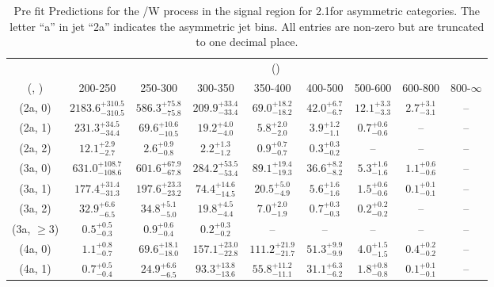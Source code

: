 \begin{table}[h!]
\tiny
\centering
\caption{Pre fit Predictions for the \ttbar/W process in the signal region for 2.1\ifb for asymmetric categories. The letter ``a'' in jet \eg ``2a''  indicates the asymmetric jet bins. All entries are non-zero but are truncated to one decimal place.\label{tab:predsepnaive_sig_ttw_asym}}
\begin{tabular}
{ccccccccc}
	\hline\hline
	& \multicolumn{8}{c}{\scalht (\gev)} \\ 
	 (\njet,  \nb) & 200-250 & 250-300 & 300-350 & 350-400 & 400-500 & 500-600 & 600-800 & 800-$\infty$ \\ [0.8ex] 
\hline
	(2a, 0) & $2183.6^{+ 310.5 }_{- 310.5 }$ & $586.3^{+ 75.8 }_{- 75.8 }$ & $209.9^{+ 33.4 }_{- 33.4 }$ & $69.0^{+ 18.2 }_{- 18.2 }$ & $42.0^{+ 6.7 }_{- 6.7 }$ & $12.1^{+ 3.3 }_{- 3.3 }$ & $2.7^{+ 3.1 }_{- 3.1 }$ & -- \\[0.5ex] 
	(2a, 1) & $231.3^{+ 34.5 }_{- 34.4 }$ & $69.6^{+ 10.6 }_{- 10.5 }$ & $19.2^{+ 4.0 }_{- 4.0 }$ & $5.8^{+ 2.0 }_{- 2.0 }$ & $3.9^{+ 1.2 }_{- 1.1 }$ & $0.7^{+ 0.6 }_{- 0.6 }$ & -- & -- \\[0.5ex] 
	(2a, 2) & $12.1^{+ 2.9 }_{- 2.7 }$ & $2.6^{+ 0.9 }_{- 0.8 }$ & $2.2^{+ 1.3 }_{- 1.2 }$ & $0.9^{+ 0.7 }_{- 0.7 }$ & $0.3^{+ 0.3 }_{- 0.2 }$ & -- & -- & -- \\[0.5ex] 
	(3a, 0) & $631.0^{+ 108.7 }_{- 108.6 }$ & $601.6^{+ 67.9 }_{- 67.8 }$ & $284.2^{+ 53.5 }_{- 53.4 }$ & $89.1^{+ 19.4 }_{- 19.3 }$ & $36.6^{+ 8.2 }_{- 8.2 }$ & $5.3^{+ 1.6 }_{- 1.6 }$ & $1.1^{+ 0.6 }_{- 0.6 }$ & -- \\[0.5ex] 
	(3a, 1) & $177.4^{+ 31.4 }_{- 31.3 }$ & $197.6^{+ 23.3 }_{- 23.2 }$ & $74.4^{+ 14.6 }_{- 14.5 }$ & $20.5^{+ 5.0 }_{- 4.9 }$ & $5.6^{+ 1.6 }_{- 1.6 }$ & $1.5^{+ 0.6 }_{- 0.6 }$ & $0.1^{+ 0.1 }_{- 0.1 }$ & -- \\[0.5ex] 
	(3a, 2) & $32.9^{+ 6.6 }_{- 6.5 }$ & $34.8^{+ 5.1 }_{- 5.0 }$ & $19.8^{+ 4.5 }_{- 4.4 }$ & $7.0^{+ 2.0 }_{- 1.9 }$ & $0.7^{+ 0.3 }_{- 0.3 }$ & $0.2^{+ 0.2 }_{- 0.2 }$ & -- & -- \\[0.5ex] 
	(3a, $\ge3$) & $0.5^{+ 0.5 }_{- 0.3 }$ & $0.9^{+ 0.6 }_{- 0.4 }$ & $0.2^{+ 0.3 }_{- 0.2 }$ & -- & -- & -- & -- & -- \\[0.5ex] 
	(4a, 0) & $1.1^{+ 0.8 }_{- 0.7 }$ & $69.6^{+ 18.1 }_{- 18.0 }$ & $157.1^{+ 23.0 }_{- 22.8 }$ & $111.2^{+ 21.9 }_{- 21.7 }$ & $51.3^{+ 9.9 }_{- 9.9 }$ & $4.0^{+ 1.5 }_{- 1.5 }$ & $0.4^{+ 0.2 }_{- 0.2 }$ & -- \\[0.5ex] 
	(4a, 1) & $0.7^{+ 0.5 }_{- 0.4 }$ & $24.9^{+ 6.6 }_{- 6.5 }$ & $93.3^{+ 13.8 }_{- 13.6 }$ & $55.8^{+ 11.2 }_{- 11.1 }$ & $31.1^{+ 6.3 }_{- 6.2 }$ & $1.8^{+ 0.8 }_{- 0.8 }$ & $0.1^{+ 0.1 }_{- 0.1 }$ & -- \\[0.5ex] 

\end{tabular}
\end{table}
